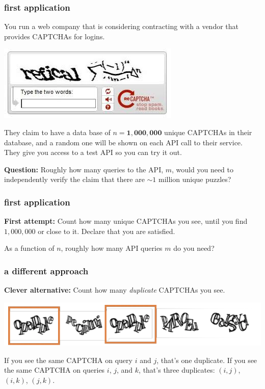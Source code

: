 \documentclass[]{beamer}
\begin{document}
	\begin{frame}
		\frametitle{first application}
		You run a web company that is considering contracting with a vendor that provides CAPTCHAs for logins.
		\begin{center}
			\includegraphics[width=.5\textwidth]{latex_captcha.jpeg}
		\end{center}
		They claim to have a data base of $n = \mathbf{1,000,000}$ unique CAPTCHAs in their database, and a random one will be shown on each API call to their service. They give you access to a test API so you can try it out.
		
		\textbf{Question:} Roughly how many queries to the API, $m$, would you need to independently verify the claim that there are $\sim 1$ million unique puzzles?  
	\end{frame}
	
	\begin{frame}
		\frametitle{first application}
		\textbf{First attempt:} Count how many unique CAPTCHAs you see, until you find $1,000,000$ or close to it. Declare that you are satisfied. 
		
		As a function of $n$, roughly how many API queries $m$ do you need?
	\end{frame}
	
	\begin{frame}
		\frametitle{a different approach}
		\textbf{Clever alternative:} Count how many \emph{duplicate} CAPTCHAs you see.
		
		\vspace{.5em}
		\begin{center}
			\includegraphics[width=.6\textwidth]{duplicates.png}
			\vspace{.5em}
		\end{center}
	
	 If you see the same CAPTCHA on query $i$ and $j$, that's one duplicate. If you see the same CAPTCHA on queries $i$, $j$, and $k$, that's three duplicates: $(i,j)$, $(i,k)$, $(j,k)$. 
	\end{frame}
	
\end{document}
